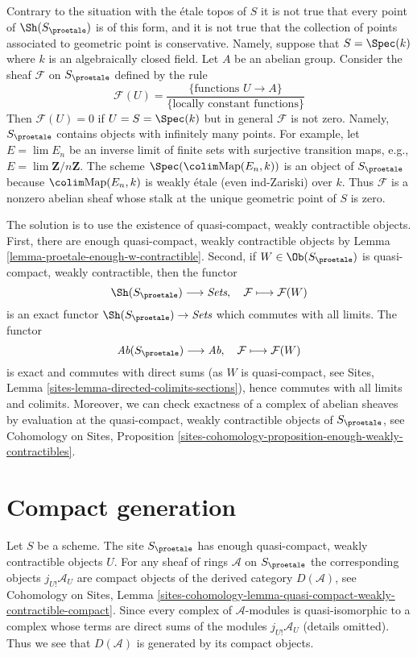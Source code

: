 \noindent
Contrary to the situation with the \'etale topos of $S$ it is not true
that every point of $\Sh(S_\proetale)$ is of this form, and it is not
true that the collection of points associated to geometric point is
conservative. Namely, suppose that $S = \Spec(k)$ where $k$ is an
algebraically closed field. Let $A$ be an abelian group.
Consider the sheaf $\mathcal{F}$ on $S_\proetale$ defined by the rule
$$
\mathcal{F}(U) = \frac{\{\text{functions }U \to A\}}{\{\text{locally constant functions}\}}
$$
Then $\mathcal{F}(U) = 0$ if $U = S = \Spec(k)$ but in general $\mathcal{F}$
is not zero. Namely, $S_\proetale$ contains objects with infinitely many
points. For example, let $E = \lim E_n$ be an inverse limit of
finite sets with surjective transition maps,
e.g., $E = \lim \mathbf{Z}/n\mathbf{Z}$.
The scheme $\Spec(\colim \text{Map}(E_n, k))$
is an object of $S_\proetale$ because $\colim \text{Map}(E_n, k)$
is weakly \'etale (even ind-Zariski) over $k$.
Thus $\mathcal{F}$ is a nonzero abelian sheaf whose stalk at the
unique geometric point of $S$ is zero.

\medskip\noindent
The solution is to use the existence of quasi-compact, weakly contractible
objects. First, there are enough quasi-compact, weakly contractible objects by
Lemma \ref{lemma-proetale-enough-w-contractible}.
Second, if $W \in \Ob(S_\proetale)$ is quasi-compact, weakly contractible,
then the functor
$$
\Sh(S_\proetale) \longrightarrow \textit{Sets},\quad
\mathcal{F} \longmapsto \mathcal{F}(W)
$$
is an exact functor $\Sh(S_\proetale) \to \textit{Sets}$ which commutes
with all limits. The functor
$$
\textit{Ab}(S_\proetale) \longrightarrow \textit{Ab},\quad
\mathcal{F} \longmapsto \mathcal{F}(W)
$$
is exact and commutes with direct sums (as $W$ is quasi-compact, see
Sites, Lemma \ref{sites-lemma-directed-colimits-sections}), hence
commutes with all limits and colimits. Moreover, we can check exactness of
a complex of abelian sheaves by evaluation at the
quasi-compact, weakly contractible objects of $S_\proetale$, see
Cohomology on Sites, Proposition
\ref{sites-cohomology-proposition-enough-weakly-contractibles}.




\section{Compact generation}
\label{section-compact-generation}

\noindent
Let $S$ be a scheme. The site $S_\proetale$ has enough quasi-compact,
weakly contractible objects $U$. For any sheaf of rings $\mathcal{A}$
on $S_\proetale$ the corresponding objects $j_{U!}\mathcal{A}_U$
are compact objects of the derived category $D(\mathcal{A})$, see
Cohomology on Sites, Lemma
\ref{sites-cohomology-lemma-quasi-compact-weakly-contractible-compact}.
Since every complex of $\mathcal{A}$-modules is quasi-isomorphic to
a complex whose terms are direct sums of the modules
$j_{U!}\mathcal{A}_U$ (details omitted). Thus we see that
$D(\mathcal{A})$ is generated by its compact objects.

